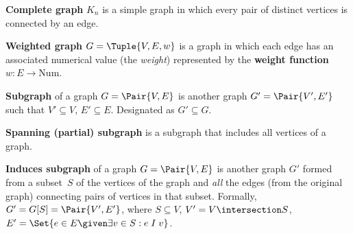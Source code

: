\documentclass[a4paper,10pt]{article}
\begin{document}
\begin{terms}
    \item \textbf{Complete graph} $K_n$ is a simple graph in which every pair of distinct vertices is connected by an edge.

    \item \textbf{Weighted graph} $G = \Tuple{V, E, w}$ is a graph in which each edge has an associated numerical value (the \emph{weight}) represented by the \textbf{weight function} $w: E \to \mathrm{Num}$.

    \item \textbf{Subgraph} of a graph $G = \Pair{V,E}$ is another graph $G' = \Pair{V',E'}$ such that $V' \subseteq V$, $E' \subseteq E$. Designated as $G' \subseteq G$.

    \item \textbf{Spanning (partial) subgraph} is a subgraph that includes all vertices of a graph.

    \item \textbf{Induces subgraph} of a graph $G = \Pair{V,E}$ is another graph $G'$ formed from a subset~$S$ of the vertices of the graph and \emph{all} the edges (from the original graph) connecting pairs of vertices in that subset.
    Formally, $G' = G[S] = \Pair{V',E'}$, where $S \subseteq V$, $V' = V \intersection S$, $E' = \Set{e \in E \given \exists v \in S: e \mathrel{I} v}$.

    \begin{minipage}{\linewidth}


\end{minipage}
\end{terms}
\end{document}
